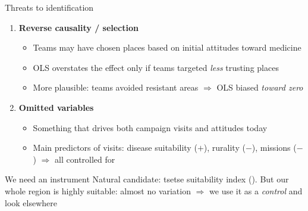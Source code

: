 \documentclass[aspectratio=1610]{beamer}
\newcommand{\refs}[1]{{\footnotesize\color{softgray}(\citealp{#1})}} %
\begin{document}
\begin{frame}{Threats to identification}
  \begin{enumerate}
    \item \textbf{Reverse causality / selection}
      \begin{itemize}
        \item Teams may have chosen places based on initial attitudes toward medicine
        \item OLS overstates the effect only if teams targeted \emph{less} trusting places
        \item More plausible: teams avoided resistant areas $\Rightarrow$ OLS biased \emph{toward zero}
      \end{itemize}
    \item \textbf{Omitted variables}
      \begin{itemize}
        \item Something that drives both campaign visits and attitudes today
        \item Main predictors of visits: disease suitability ($+$), rurality ($-$), missions ($-$)
          $\Rightarrow$ all controlled for
      \end{itemize}
  \end{enumerate}
  \pause
  \vspace{0.4em}
  \begin{block}{We need an instrument}
    Natural candidate: tsetse suitability index \refs{alsan_2015}. But our whole region is highly
    suitable: almost no variation $\Rightarrow$ we use it as a \emph{control} and look elsewhere
  \end{block}
\end{frame}
\end{document}
